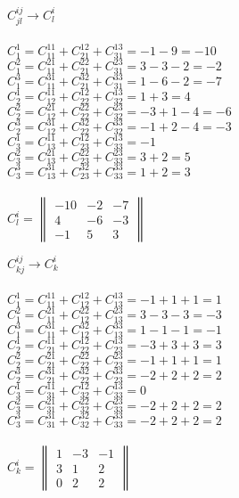 \documentclass{article}
\begin{document}
\begin{multicols}{2}
\begin{center}
$C^{ij}_{jl} \rightarrow C^{i}_{l}$ \\ \, \\
$C^{1}_{1} = C^{11}_{11} + C^{12}_{21} + C^{13}_{31} = -1 -9 = -10$ \\
$C^{2}_{1} = C^{21}_{11} + C^{22}_{21} + C^{23}_{31} = 3 -3 -2 = -2$ \\
$C^{3}_{1} = C^{31}_{11} + C^{32}_{21} + C^{33}_{31} = 1 -6 -2 = -7$ \\
$C^{1}_{2} = C^{11}_{12} + C^{12}_{22} + C^{13}_{32} = 1 +3 = 4$ \\
$C^{2}_{2} = C^{21}_{12} + C^{22}_{22} + C^{23}_{32} = -3 +1 -4 = -6$ \\
$C^{3}_{2} = C^{31}_{12} + C^{32}_{22} + C^{33}_{32} = -1 +2 -4 = -3$ \\
$C^{1}_{3} = C^{11}_{13} + C^{12}_{23} + C^{13}_{33} = -1$ \\
$C^{2}_{3} = C^{21}_{13} + C^{22}_{23} + C^{23}_{33} = 3 +2 = 5$ \\
$C^{3}_{3} = C^{31}_{13} + C^{32}_{23} + C^{33}_{33} = 1 +2 = 3$ \\ \, \\
$C^{i}_{l} = \begin{Vmatrix}-10 & -2 & -7 \\ 4 & -6 & -3 \\ -1 & 5 & 3\end{Vmatrix}$
\end{center}
\begin{center}
$C^{ij}_{kj} \rightarrow C^{i}_{k}$ \\ \, \\
$C^{1}_{1} = C^{11}_{11} + C^{12}_{12} + C^{13}_{13} = -1 +1 +1 = 1$ \\
$C^{2}_{1} = C^{21}_{11} + C^{22}_{12} + C^{23}_{13} = 3 -3 -3 = -3$ \\
$C^{3}_{1} = C^{31}_{11} + C^{32}_{12} + C^{33}_{13} = 1 -1 -1 = -1$ \\
$C^{1}_{2} = C^{11}_{21} + C^{12}_{22} + C^{13}_{23} = -3 +3 +3 = 3$ \\
$C^{2}_{2} = C^{21}_{21} + C^{22}_{22} + C^{23}_{23} = -1 +1 +1 = 1$ \\
$C^{3}_{2} = C^{31}_{21} + C^{32}_{22} + C^{33}_{23} = -2 +2 +2 = 2$ \\
$C^{1}_{3} = C^{11}_{31} + C^{12}_{32} + C^{13}_{33} = 0$ \\
$C^{2}_{3} = C^{21}_{31} + C^{22}_{32} + C^{23}_{33} = -2 +2 +2 = 2$ \\
$C^{3}_{3} = C^{31}_{31} + C^{32}_{32} + C^{33}_{33} = -2 +2 +2 = 2$ \\ \, \\
$C^{i}_{k} = \begin{Vmatrix}1 & -3 & -1 \\ 3 & 1 & 2 \\ 0 & 2 & 2\end{Vmatrix}$
\end{center}
\end{multicols}
\end{document}

